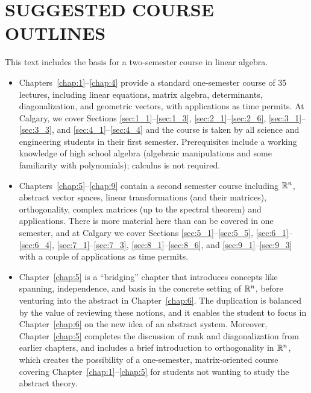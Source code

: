\section*{SUGGESTED COURSE OUTLINES}

This text includes the basis for a two-semester course in linear algebra.


\begin{itemize}
\item Chapters~\ref{chap:1}--\ref{chap:4}
 provide a standard one-semester course of 35 lectures, including linear
 equations, matrix algebra, determinants, diagonalization, and geometric
 vectors, with applications as time permits. At Calgary, we cover Sections \ref{sec:1_1}--\ref{sec:1_3}, \ref{sec:2_1}--\ref{sec:2_6}, \ref{sec:3_1}--\ref{sec:3_3}, and \ref{sec:4_1}--\ref{sec:4_4} and the course is taken by all science and engineering students in 
their first semester. Prerequisites include a working knowledge of high 
school algebra (algebraic manipulations and some familiarity with 
polynomials); calculus is not required.

\item Chapters~\ref{chap:5}--\ref{chap:9} contain a second semester course including $\mathbb{R}^n$,
 abstract vector spaces, linear transformations (and their matrices), 
orthogonality, complex matrices (up to the spectral theorem) and 
applications. There is more material here than can be covered in one 
semester, and at Calgary we cover Sections \ref{sec:5_1}--\ref{sec:5_5}, \ref{sec:6_1}--\ref{sec:6_4}, \ref{sec:7_1}--\ref{sec:7_3}, \ref{sec:8_1}--\ref{sec:8_6}, and \ref{sec:9_1}--\ref{sec:9_3} with a couple of applications as time permits.

\item Chapter~\ref{chap:5} is a ``bridging'' chapter that introduces concepts like spanning, independence, and basis in the concrete setting of $\mathbb{R}^n$, before venturing into the abstract in Chapter~\ref{chap:6}. The duplication is balanced by the value of reviewing these notions, and it enables the student to focus in Chapter~\ref{chap:6} on the new idea of an abstract system. Moreover, Chapter~\ref{chap:5}
 completes the discussion of rank and diagonalization from earlier 
chapters, and includes a brief introduction to orthogonality in $\mathbb{R}^n$, which creates the possibility of a one-semester, matrix-oriented course covering Chapter~\ref{chap:1}--\ref{chap:5} for students not wanting to study the abstract theory.

\end{itemize}

